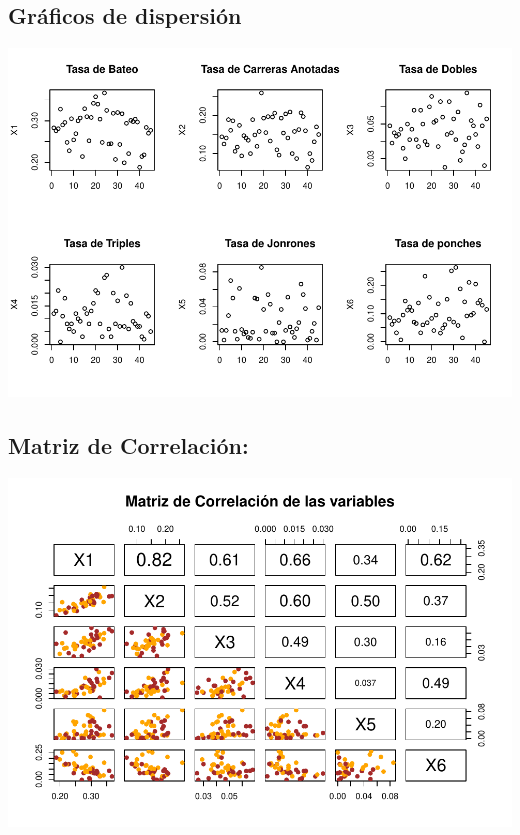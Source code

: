 \documentclass{staprojteamusb}
\begin{document}
	
	
	\maketitle
	
	
	
	\hypertarget{gruxe1ficos-de-dispersiuxf3n}{%
 \subsection{Gráficos de
 dispersión}\label{gruxe1ficos-de-dispersiuxf3n}}

 \includegraphics{Dispersion-y-Matriz-de-Correlacion_files/figure-latex/unnamed-chunk-3-1.pdf}

 \hypertarget{matriz-de-correlaciuxf3n}{%
 \subsection{Matriz de Correlación:}\label{matriz-de-correlaciuxf3n}}

 \includegraphics{Dispersion-y-Matriz-de-Correlacion_files/figure-latex/unnamed-chunk-4-1.pdf}
	
	
	
	\printbibliography
	
	
	
	
\end{document}
